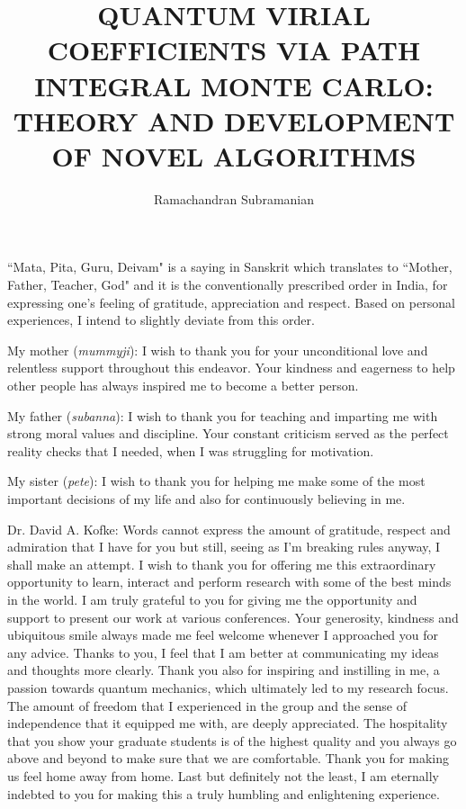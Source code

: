 \documentclass[10pt]{ubthesis}
\title{QUANTUM VIRIAL COEFFICIENTS VIA PATH INTEGRAL MONTE CARLO: THEORY AND DEVELOPMENT OF NOVEL ALGORITHMS}
\author{Ramachandran Subramanian}
\begin{document}
\begin{titlepage}
\maketitle
\end{titlepage}

\begin{ubfrontmatter}
\makecopyright
\cleardoublepage
\begin{acknowledgements}
    ``Mata, Pita, Guru, Deivam" is a saying in Sanskrit which translates to ``Mother, Father, Teacher, God" and it is the conventionally prescribed order in India, for expressing one's feeling of gratitude, appreciation and respect. Based on personal experiences, I intend to slightly deviate from this order.

    \noindent My mother (\emph{mummyji}): I wish to thank you for your unconditional love and relentless support throughout this endeavor. Your kindness and eagerness to help other people has always inspired me to become a better person.
    
    \noindent My father (\emph{subanna}): I wish to thank you for teaching and imparting me with strong moral values and discipline. Your constant criticism served as the perfect reality checks that I needed, when I was struggling for motivation.

    \noindent My sister (\emph{pete}): I wish to thank you for helping me make some of the most important decisions of my life and also for continuously believing in me.

    \noindent Dr. David A. Kofke: Words cannot express the amount of gratitude, respect and admiration that I have for you but still, seeing as I'm breaking rules anyway, I shall make an attempt. I wish to thank you for offering me this extraordinary opportunity to learn, interact and perform research with some of the best minds in the world. I am truly grateful to you for giving me the opportunity and support to present our work at various conferences. Your generosity, kindness and ubiquitous smile always made me feel welcome whenever I approached you for any advice. Thanks to you, I feel that I am better at communicating my ideas and thoughts more clearly. Thank you also for inspiring and instilling in me, a passion towards quantum mechanics, which ultimately led to my research focus. The amount of freedom that I experienced in the group and the sense of independence that it equipped me with, are deeply appreciated. The hospitality that you show your graduate students is of the highest quality and you always go above and beyond to make sure that we are comfortable. Thank you for making us feel home away from home. Last but definitely not the least, I am eternally indebted to you for making this a truly humbling and enlightening experience.


\end{acknowledgements}
\end{ubfrontmatter}
\end{document}
